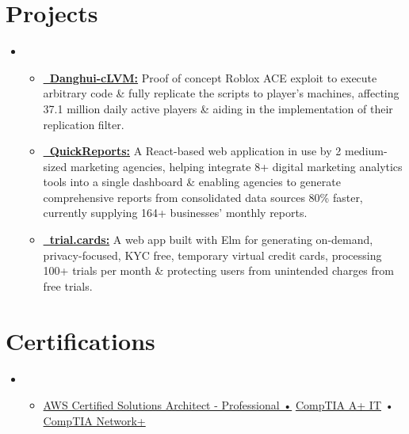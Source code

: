 \documentclass[letterpaper,11pt]{article}
\newcommand{\cvitem}[1]{
  \item\small{
    {#1\vspace{-2pt}}
  }
}
\newcommand{\cvheadingstart}{\begin{itemize}[leftmargin=0in, label={}]}
\newcommand{\cvheadingend}{\end{itemize}}
\newcommand{\cvitemstart}{\begin{itemize}\justifying}
\newcommand{\cvitemend}{\end{itemize}\vspace{-5pt}}
\begin{document}
\section{Projects}
\cvheadingstart
\item
\cvitemstart
  \cvitem{\textbf{\href{https://github.com/AmirAgassi/Danghui-LVM}{\faGithub \ Danghui-cLVM:}} Proof of concept Roblox ACE exploit to execute arbitrary code \& fully replicate the scripts to player's machines, affecting 37.1 million daily active players \& aiding in the implementation of their replication filter.}
  \vspace{0pt}
  \cvitem{\textbf{\href{https://quickreports.me}{\faChartBar \ QuickReports:}} A React-based web application in use by 2 medium-sized marketing agencies, helping integrate 8+ digital marketing analytics tools into a single dashboard \& enabling agencies to generate comprehensive reports from consolidated data sources 80\% faster, currently supplying 164+ businesses' monthly reports.}
  \vspace{6pt}
  \cvitem{\textbf{\href{https://github.com/AmirAgassi/trial.cards}{\faGithub \ trial.cards:}} A web app built with Elm for generating on-demand, privacy-focused, KYC free, temporary virtual credit cards, processing 100+ trials per month \& protecting users from unintended charges from free trials.}
\cvitemend
\cvheadingend


\section{Certifications}
\cvheadingstart
\item
\cvitemstart
  \cvitem{\href{https://cp.certmetrics.com/amazon/en/public/verify/credential/2LC36B3CWM411J3K}{AWS Certified Solutions Architect - Professional •} \href{https://www.certmetrics.com/comptia/public/verification.aspx/}{CompTIA A+ IT}}• \href{https://www.certmetrics.com/comptia/public/verification.aspx/}{CompTIA Network+}
\cvitemend
\cvheadingend
\end{document}

